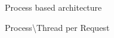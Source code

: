 \begin{frame}{Process based architecture}
  \begin{center}
    Process\textbackslash Thread per Request
  \end{center}
\end{frame}